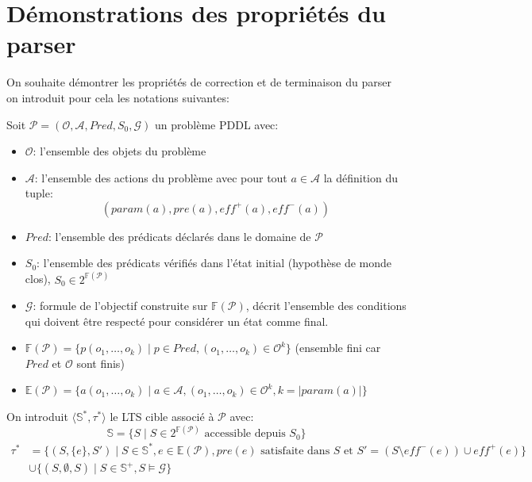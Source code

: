 

\section{Démonstrations des propriétés du parser}

On souhaite démontrer les propriétés de correction et de terminaison du parser on introduit pour cela les notations suivantes:

Soit $\mathcal{P} = (\mathcal{O}, \mathcal{A}, Pred, S_0, \mathcal{G})$ un problème PDDL avec:
\begin{itemize}
    \item $\mathcal{O}$: l'ensemble des objets du problème
    \item $\mathcal{A}$: l'ensemble des actions du problème avec pour tout $a\in \mathcal{A}$ la définition du tuple:  $$(param(a),pre(a),eff^+(a),eff^-(a))$$
    \item $Pred$: l'ensemble des prédicats déclarés dans le domaine de $\mathcal{P}$
    \item $S_0$: l'ensemble des prédicats vérifiés dans l'état initial (hypothèse de monde clos), $S_0 \in 2^{\mathds{F}(\mathcal{P})}$
    \item $\mathcal{G}$: formule de l'objectif construite sur $\mathds{F}(\mathcal{P})$, décrit l'ensemble des conditions qui doivent être respecté pour considérer un état comme final.
    \item $\mathds{F}(\mathcal{P}) = \{ p(o_1,\dots,o_k) \mid p\in Pred, (o_1, \dots,o_k) \in \mathcal{O}^k \}$ (ensemble fini car $Pred$ et $\mathcal{O}$ sont finis)
    \item $\mathds{E}(\mathcal{P}) = \{ a(o_1,\dots, o_k) \mid a \in \mathcal{A}, (o_1, \dots,o_k) \in \mathcal{O}^k, k = \lvert param(a) \rvert \}$
\end{itemize}

On introduit $\langle \mathds{S}^*, \tau^*\rangle$ le LTS cible associé à $\mathcal{P}$ avec: 
$$\mathds{S} = \{S  \mid S \in 2^{\mathds{F}(\mathcal{P})} \text{ accessible depuis }S_0\}$$
\begin{equation*}
    \begin{aligned}
    \tau^* &= \{(S, \{e\}, S') \mid S \in \mathbb{S}^*, e \in \mathbb{E}(\mathcal{P}), pre(e) \text{ satisfaite dans } S \text{ et } S' = (S \setminus eff^-(e)) \cup eff^+(e)\} \\
    &\cup \{(S, \emptyset, S) \mid S \in \mathbb{S}^+, S \models \mathcal{G}\}
    \end{aligned}
\end{equation*}

